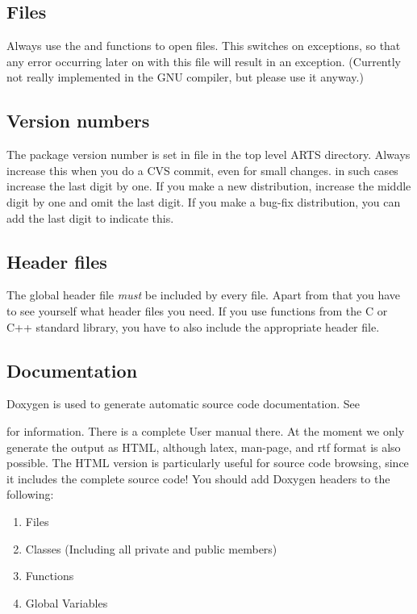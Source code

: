 \subsection{Files}
Always use the  and 
functions to open files. This switches on exceptions, so that any
error occurring later on with this file will result in an
exception. (Currently not really implemented in the GNU compiler,
but please use it anyway.)

\subsection{Version numbers} 
The package version number is set in file  in the
top level ARTS directory. Always increase this when you do a CVS
commit, even for small changes. in such cases increase the last digit
by one. If you make a new distribution, increase the middle digit by
one and omit the last digit. If you make a bug-fix distribution, you
can add the last digit to indicate this. 

\subsection{Header files} 
The global header file  \emph{must} be included by every
file. Apart from that you have to see yourself what header files you
need. If you use functions from the C or C++ standard library, you
have to also include the appropriate header file.

\subsection{Documentation}
Doxygen is used to generate automatic source code documentation. See
\begin{quote}
\end{quote}
for information. There is a complete User manual there. At the moment
we only generate the output as HTML, although latex, man-page, and rtf
format is also possible. The HTML version is particularly useful for
source code browsing, since it includes the complete source code! You
should add Doxygen headers to the following:

\begin{enumerate}
\item Files
\item Classes (Including all private and public members)
\item Functions
\item Global Variables
\end{enumerate}

